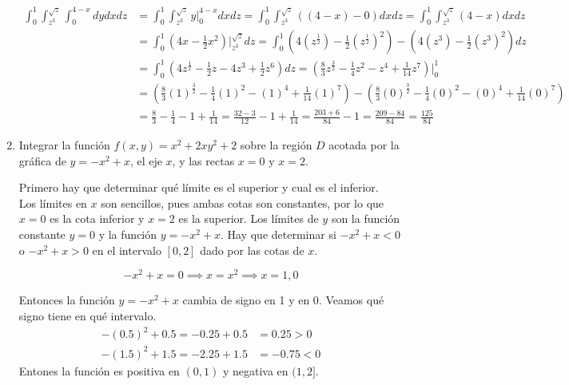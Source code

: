 \documentclass{article}
\begin{document}
\begin{enumerate}
{        \begin{align*}
            \int_{0}^{1} \int_{z^3}^{\sqrt{z}} \int_{0}^{4-x} dydxdz
                &= \int_{0}^{1} \int_{z^3}^{\sqrt{z}} y \Big|_{0}^{4-x} dxdz
                    = \int_{0}^{1} \int_{z^3}^{\sqrt{z}} ((4-x)-0) dxdz
                    = \int_{0}^{1} \int_{z^3}^{\sqrt{z}} (4-x) dxdz\\
                &= \int_{0}^{1} (4x - \frac{1}{2}x^2) \Big |_{z^3}^{\sqrt{z}} dz
                    = \int_{0}^{1} (4(z^{\frac{1}{2}}) - \frac{1}{2}(z^{\frac{1}{2}})^2) - (4(z^3)
                    - \frac{1}{2}(z^3)^2) dz\\
                &= \int_{0}^{1} (4z^{\frac{1}{2}} - \frac{1}{2}z - 4z^3 + \frac{1}{2}z^6) dz
                    = (\frac{8}{3}z^{\frac{3}{2}} - \frac{1}{4}z^2 - z^4 + \frac{1}{14}z^7) \Big |_{0}^{1}\\
                &= (\frac{8}{3}(1)^{\frac{3}{2}} - \frac{1}{4}(1)^2 - (1)^4 + \frac{1}{14}(1)^7)
                    - (\frac{8}{3}(0)^{\frac{3}{2}} - \frac{1}{4}(0)^2 - (0)^4 + \frac{1}{14}(0)^7)\\
                &= \frac{8}{3} - \frac{1}{4} - 1 + \frac{1}{14} = \frac{32-3}{12} - 1 + \frac{1}{14}
                    = \frac{203+6}{84} - 1 = \frac{209 - 84}{84} = \frac{125}{84}
        \end{align*}
    }

    \item {
        Integrar la función $f(x,y) = x^2 + 2xy^2 + 2$ sobre la región $D$
        acotada por la gráfica de $y = -x^2 + x$, el eje $x$, y las rectas
        $x = 0$ y $x = 2$.

        \color{azul}
				Primero hay que determinar qué límite es el superior y cual es el inferior.\\
				Los límites en $x$ son sencillos, pues ambas cotas son constantes, por lo
				que $x = 0$ es la cota inferior y $x = 2$ es la superior.
				Los límites de $y$ son la función constante $y = 0$ y la función
				$y = -x^2 + x$. Hay que determinar si  $-x^2 + x < 0 $ o $-x^2 + x > 0 $
				en el intervalo $[0, 2]$ dado por las cotas de $x$.

        \[-x^2 + x = 0 \implies x = x^2 \implies x = 1, 0\]

				Entonces la función $y = -x^2 + x$ cambia de signo en 1 y en 0. Veamos
				qué signo tiene en qué intervalo.
        \begin{align*}
            -(0.5)^2 + 0.5 = -0.25 + 0.5 & = 0.25 > 0 \\
            -(1.5)^2 + 1.5 = -2.25 + 1.5 & = -0.75 < 0
        \end{align*}
        Entones la función es positiva en $(0, 1)$ y negativa en $(1, 2]$.

}
\end{enumerate}
\end{document}
